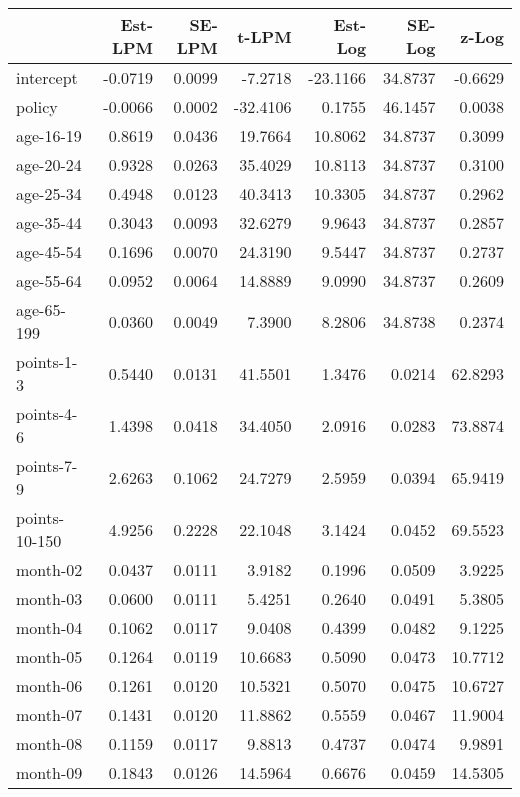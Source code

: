 \documentclass[10pt]{article}
\begin{document}
\begin{table}[ht]
\centering
\begin{tabular}{lrrrrrr}
  \hline
 & Est-LPM & SE-LPM & t-LPM & Est-Log & SE-Log & z-Log \\ 
  \hline
intercept & -0.0719 & 0.0099 & -7.2718 & -23.1166 & 34.8737 & -0.6629 \\ 
  policy & -0.0066 & 0.0002 & -32.4106 & 0.1755 & 46.1457 & 0.0038 \\ 
  age-16-19 & 0.8619 & 0.0436 & 19.7664 & 10.8062 & 34.8737 & 0.3099 \\ 
  age-20-24 & 0.9328 & 0.0263 & 35.4029 & 10.8113 & 34.8737 & 0.3100 \\ 
  age-25-34 & 0.4948 & 0.0123 & 40.3413 & 10.3305 & 34.8737 & 0.2962 \\ 
  age-35-44 & 0.3043 & 0.0093 & 32.6279 & 9.9643 & 34.8737 & 0.2857 \\ 
  age-45-54 & 0.1696 & 0.0070 & 24.3190 & 9.5447 & 34.8737 & 0.2737 \\ 
  age-55-64 & 0.0952 & 0.0064 & 14.8889 & 9.0990 & 34.8737 & 0.2609 \\ 
  age-65-199 & 0.0360 & 0.0049 & 7.3900 & 8.2806 & 34.8738 & 0.2374 \\ 
  points-1-3 & 0.5440 & 0.0131 & 41.5501 & 1.3476 & 0.0214 & 62.8293 \\ 
  points-4-6 & 1.4398 & 0.0418 & 34.4050 & 2.0916 & 0.0283 & 73.8874 \\ 
  points-7-9 & 2.6263 & 0.1062 & 24.7279 & 2.5959 & 0.0394 & 65.9419 \\ 
  points-10-150 & 4.9256 & 0.2228 & 22.1048 & 3.1424 & 0.0452 & 69.5523 \\ 
  month-02 & 0.0437 & 0.0111 & 3.9182 & 0.1996 & 0.0509 & 3.9225 \\ 
  month-03 & 0.0600 & 0.0111 & 5.4251 & 0.2640 & 0.0491 & 5.3805 \\ 
  month-04 & 0.1062 & 0.0117 & 9.0408 & 0.4399 & 0.0482 & 9.1225 \\ 
  month-05 & 0.1264 & 0.0119 & 10.6683 & 0.5090 & 0.0473 & 10.7712 \\ 
  month-06 & 0.1261 & 0.0120 & 10.5321 & 0.5070 & 0.0475 & 10.6727 \\ 
  month-07 & 0.1431 & 0.0120 & 11.8862 & 0.5559 & 0.0467 & 11.9004 \\ 
  month-08 & 0.1159 & 0.0117 & 9.8813 & 0.4737 & 0.0474 & 9.9891 \\ 
  month-09 & 0.1843 & 0.0126 & 14.5964 & 0.6676 & 0.0459 & 14.5305 \\ 

\end{tabular}
\end{table}
\end{document}

